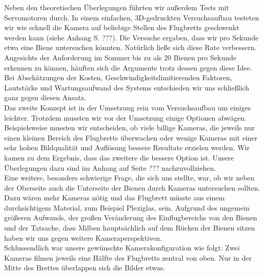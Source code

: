 \documentclass[11pt,a4paper]{article}
\begin{document}
Neben den theoretischen Überlegungen führten wir außerdem Tests mit Servomotoren durch. In einem einfachen, 3D-gedruckten Versuchsaufbau testeten wir wie schnell die Kamera auf beliebige Stellen des Flugbretts geschwenkt werden kann (siehe Anhang S. ???). Die Versuche ergaben, dass wir pro Sekunde etwa eine Biene untersuchen könnten. Natürlich ließe sich diese Rate verbessern. Angesichts der Anforderung im Sommer bis zu als 20 Bienen pro Sekunde erkennen zu können, häuften sich die Argumente trotz dessen gegen diese Idee. Bei Abschätzungen der Kosten, Geschwindigkeitslimitierenden Faktoren, Lautstärke und Wartungsaufwand des Systems entschieden wir uns schließlich ganz gegen diesen Ansatz.\\
Das zweite Konzept ist in der Umsetzung rein vom Versuchsaufbau um einiges leichter. Trotzdem mussten wir vor der Umsetzung einige Optionen abwägen. Beispielsweise mussten wir entscheiden, ob viele billige Kameras, die jeweils nur einen kleinen Bereich des Flugbretts überwachen oder wenige Kameras mit einer sehr hohen Bildqualität und Auflösung bessere Resultate erzielen werden. Wir kamen zu dem Ergebnis, dass das zweitere die bessere Option ist. Unsere Überlegungen dazu sind im Anhang auf Seite ??? nachzuvollziehen.\\
Eine weitere, besonders schwierige Frage, die sich uns stellte, war, ob wir neben der Oberseite auch die Unterseite der Bienen durch Kameras untersuchen sollten. Dazu wären mehr Kameras nötig und das Flugbrett müsste aus einem durchsichtigem Material, zum Beispiel Plexiglas, sein. 	Aufgrund des ungemein größeren Aufwands, der großen Veränderung des Einflugbereichs von den Bienen und der Tatsache, dass Milben hauptsächlich auf dem Rücken der Bienen sitzen haben wir uns gegen weitere Kameraperspektiven.\\
Schlussendlich war unsere gewünschte Kamerakonfiguration wie folgt: Zwei Kameras filmen jeweils eine Hälfte des Flugbretts zentral von oben. Nur in der Mitte des Brettes überlappen sich die Bilder etwas.
\end{document}
